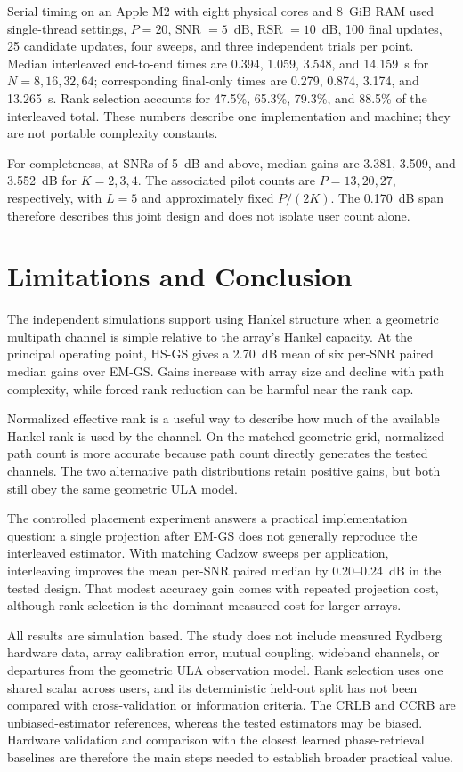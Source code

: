 \documentclass[journal]{IEEEtran}
\begin{document}
Serial timing on an Apple M2 with eight physical cores and 8~GiB RAM used
single-thread settings, $P=20$, SNR $=5$~dB, RSR $=10$~dB, 100 final
updates, 25 candidate updates, four sweeps, and three independent trials per
point. Median interleaved end-to-end times are 0.394, 1.059, 3.548, and
14.159~s for $N=8,16,32,64$; corresponding final-only times are
0.279, 0.874, 3.174, and 13.265~s. Rank selection accounts for 47.5\%,
65.3\%, 79.3\%, and 88.5\% of the interleaved total. These numbers describe
one implementation and machine; they are not portable complexity constants.

For completeness, at SNRs of 5~dB and above, median gains are 3.381,
3.509, and 3.552~dB for $K=2,3,4$. The associated pilot counts are
$P=13,20,27$, respectively, with $L=5$ and approximately fixed $P/(2K)$.
The 0.170~dB span therefore describes this joint design and does not isolate
user count alone.

\section{Limitations and Conclusion}

The independent simulations support using Hankel structure when a geometric
multipath channel is simple relative to the array's Hankel capacity. At the
principal operating point, HS-GS gives a 2.70~dB mean of six per-SNR paired
median gains over EM-GS. Gains increase with array size and decline with path
complexity, while forced rank reduction can be harmful near the rank cap.

Normalized effective rank is a useful way to describe how much of the
available Hankel rank is used by the channel. On the matched geometric grid,
normalized path count is more accurate because path count directly generates
the tested channels. The two alternative path distributions retain positive
gains, but both still obey the same geometric ULA model.

The controlled placement experiment answers a practical implementation
question: a single projection after EM-GS does not generally reproduce the
interleaved estimator. With matching Cadzow sweeps per application,
interleaving improves the mean per-SNR paired median by 0.20--0.24~dB in
the tested design. That modest accuracy gain comes with repeated projection
cost, although rank selection is the dominant measured cost for larger
arrays.

All results are simulation based. The study does not include measured Rydberg
hardware data, array calibration error, mutual coupling, wideband channels,
or departures from the geometric ULA observation model. Rank selection uses
one shared scalar across users, and its deterministic held-out split has not
been compared with cross-validation or information criteria. The CRLB and
CCRB are unbiased-estimator references, whereas the tested estimators may be
biased. Hardware validation and comparison with the closest learned
phase-retrieval baselines are therefore the main steps needed to establish
broader practical value.
\end{document}
